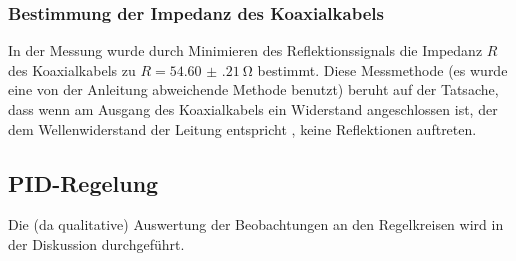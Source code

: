 \subsubsection{Bestimmung der Impedanz des Koaxialkabels}
In der Messung wurde durch Minimieren des Reflektionssignals die Impedanz \(R\) des Koaxialkabels zu \(R=\qty{54.60(21)}{\ohm}\) bestimmt. Diese Messmethode (es wurde eine von der Anleitung abweichende Methode benutzt) beruht auf der Tatsache, dass wenn am Ausgang des Koaxialkabels ein Widerstand angeschlossen ist, der dem Wellenwiderstand der Leitung entspricht \cite[vgl.][73]{Skript_1}, keine Reflektionen auftreten. 

\subsection{PID-Regelung}
Die (da qualitative) Auswertung der Beobachtungen an den Regelkreisen wird in der Diskussion durchgeführt.

